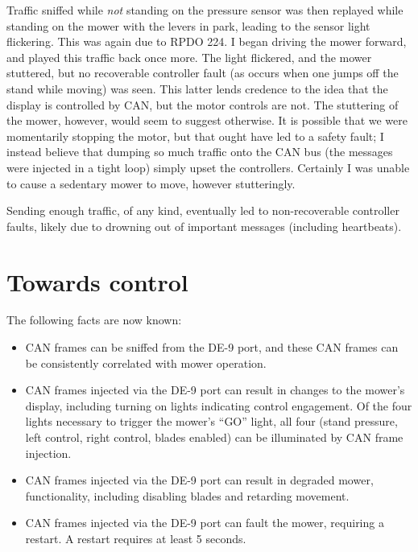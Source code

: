 \documentclass[letterpaper,10pt]{article}
\begin{document}
Traffic sniffed while \textit{not} standing on the pressure sensor was then
replayed while standing on the mower with the levers in park, leading to the
sensor light flickering. This was again due to RPDO 224. I began driving the
mower forward, and played this traffic back once more. The light flickered,
and the mower stuttered, but no recoverable controller fault (as occurs when
one jumps off the stand while moving) was seen. This latter lends credence to the
idea that the display is controlled by CAN, but the motor controls are not.
The stuttering of the mower, however, would seem to suggest otherwise. It is
possible that we were momentarily stopping the motor, but that ought have led
to a safety fault; I instead believe that dumping so much traffic onto the CAN
bus (the messages were injected in a tight loop) simply upset the controllers.
Certainly I was unable to cause a sedentary mower to move, however
stutteringly.

Sending enough traffic, of any kind, eventually led to non-recoverable
controller faults, likely due to drowning out of important messages (including
heartbeats).

\section{Towards control}
The following facts are now known:
\begin{itemize}
\item CAN frames can be sniffed from the DE-9 port, and these CAN frames can
      be consistently correlated with mower operation.
\item CAN frames injected via the DE-9 port can result in changes to the mower's
      display, including turning on lights indicating control engagement. Of the
      four lights necessary to trigger the mower's ``GO'' light, all four
      (stand pressure, left control, right control, blades enabled) can be
      illuminated by CAN frame injection.
\item CAN frames injected via the DE-9 port can result in degraded mower,
      functionality, including disabling blades and retarding movement.
\item CAN frames injected via the DE-9 port can fault the mower, requiring a
      restart. A restart requires at least 5 seconds.
\end{itemize}
\end{document}
